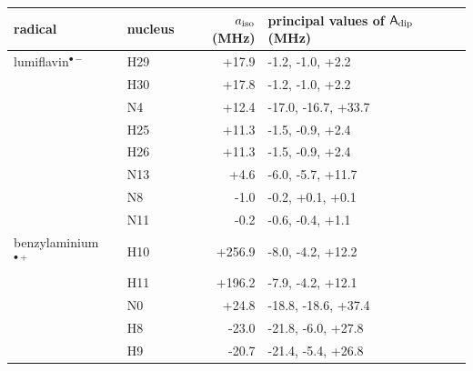 \small\begin{tabular}{llrl}
\toprule
radical & nucleus & $a_{\rm iso}$ (MHz) & principal values of $\mathsf A_{\rm dip}$ (MHz) \\
\midrule
lumiflavin$^{\bullet-}$ & H29 & +17.9 & -1.2, -1.0, +2.2 \\
 & H30 & +17.8 & -1.2, -1.0, +2.2 \\
 & N4 & +12.4 & -17.0, -16.7, +33.7 \\
 & H25 & +11.3 & -1.5, -0.9, +2.4 \\
 & H26 & +11.3 & -1.5, -0.9, +2.4 \\
 & N13 & +4.6 & -6.0, -5.7, +11.7 \\
 & N8 & -1.0 & -0.2, +0.1, +0.1 \\
 & N11 & -0.2 & -0.6, -0.4, +1.1 \\
benzylaminium$^{\bullet+}$ & H10 & +256.9 & -8.0, -4.2, +12.2 \\
 & H11 & +196.2 & -7.9, -4.2, +12.1 \\
 & N0 & +24.8 & -18.8, -18.6, +37.4 \\
 & H8 & -23.0 & -21.8, -6.0, +27.8 \\
 & H9 & -20.7 & -21.4, -5.4, +26.8 \\
\bottomrule
\end{tabular}
